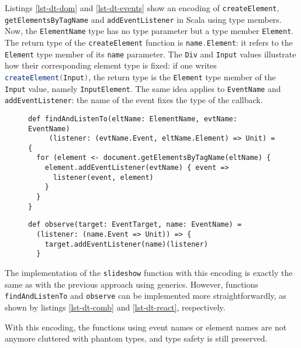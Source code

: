 \documentclass{llncs}
\newcommand{\jscode}[1]{\lstinline[language=JavaScript]|#1|}
\newcommand{\scalacode}[1]{\lstinline[language=Scala]|#1|}
\begin{document}
Listings \ref{lst-dt-dom} and \ref{lst-dt-events} show an encoding of \jscode{createElement}, \jscode{getElementsByTagName} and \jscode{addEventListener} in Scala using type members. Now, the \scalacode{ElementName} type has no type parameter but a type member \scalacode{Element}. The return type of the \scalacode{createElement} function is \scalacode{name.Element}: it refers to the \scalacode{Element} type member of its \scalacode{name} parameter. The \scalacode{Div} and \scalacode{Input} values illustrate how their corresponding element type is fixed: if one writes \scalacode{createElement(Input)}, the return type is the \scalacode{Element} type member of the \scalacode{Input} value, namely \scalacode{InputElement}. The same idea applies to \scalacode{EventName} and \scalacode{addEventListener}: the name of the event fixes the type of the callback.

\begin{figure}
\begin{lstlisting}[label=lst-dt-comb,caption={Combination of \scalacode{getElementsByTagName} and \scalacode{addEventListener} using path-dependent types}]
def findAndListenTo(eltName: ElementName, evtName: EventName)
     (listener: (evtName.Event, eltName.Element) => Unit) = {
  for (element <- document.getElementsByTagName(eltName) {
    element.addEventListener(evtName) { event =>
      listener(event, element)
    }
  }
}
\end{lstlisting}
\end{figure}

\begin{figure}
\begin{lstlisting}[label=lst-dt-react,caption={Partial application of \scalacode{addEventListener} using path-dependent types}]
def observe(target: EventTarget, name: EventName) =
  (listener: (name.Event => Unit)) => {
    target.addEventListener(name)(listener)
  }
\end{lstlisting}
\end{figure}

The implementation of the \scalacode{slideshow} function with this encoding is exactly the same as with the previous approach using generics. However, functions \jscode{findAndListenTo} and \jscode{observe} can be implemented more straightforwardly, as shown by listings \ref{lst-dt-comb} and \ref{lst-dt-react}, respectively.

With this encoding, the functions using event names or element names are not anymore cluttered with phantom types, and type safety is still preserved.
\end{document}

